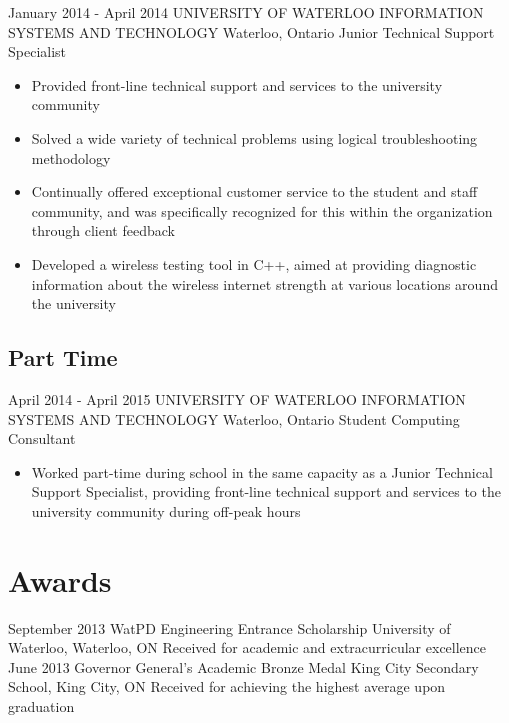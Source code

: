 \documentclass[hidelinks]{kkurucz-cv}
\begin{document}
\begin{entrylist}
\entry
{January 2014 - April 2014}
{UNIVERSITY OF WATERLOO INFORMATION SYSTEMS AND TECHNOLOGY}
{Waterloo, Ontario}
{Junior Technical Support Specialist}
{
\begin{itemize}
	\item Provided front-line technical support and services to the university community
	\item Solved a wide variety of technical problems using logical troubleshooting methodology
	\item Continually offered exceptional customer service to the student and staff community, and was specifically recognized for this within the organization through client feedback
	\item Developed a wireless testing tool in C++, aimed at providing diagnostic information about the wireless internet strength at various locations around the university
\end{itemize}
}
\end{entrylist}

\subsection{Part Time}

\begin{entrylist}
\entry
{April 2014 - April 2015}
{UNIVERSITY OF WATERLOO INFORMATION SYSTEMS AND TECHNOLOGY}
{Waterloo, Ontario}
{Student Computing Consultant}
{
\begin{itemize}
	\item Worked part-time during school in the same capacity as a Junior Technical Support Specialist, providing front-line technical support and services to the university community during off-peak hours
\end{itemize}
}
\end{entrylist}


\section{Awards}

\begin{entrylist}
\entry
{September 2013}
{WatPD Engineering Entrance Scholarship}
{University of Waterloo, Waterloo, ON}
{Received for academic and extracurricular excellence}
{\null}
\entry
{June 2013}
{Governor General's Academic Bronze Medal}
{King City Secondary School, King City, ON}
{Received for achieving the highest average upon graduation}
{\null}
\end{entrylist}
\end{document}
